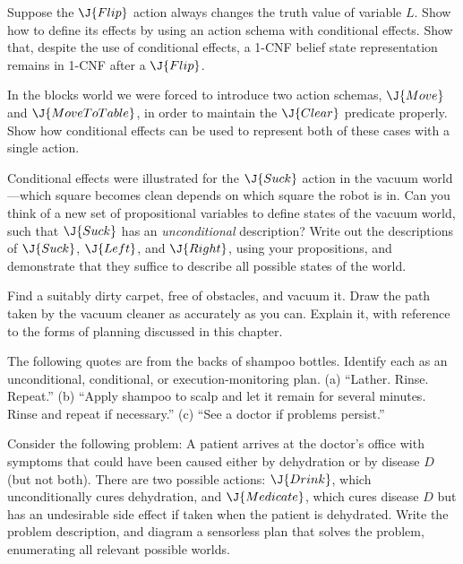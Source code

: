\begin{exercise}
Suppose the \(\J{Flip}\) action always changes the truth value of variable \(L\).
Show how to define its effects by using an action schema with conditional effects.
Show that, despite the use of conditional effects, a 1-CNF belief state representation remains in 1-CNF after a \(\J{Flip}\).
\end{exercise} 

\begin{exercise}
In the blocks 
world we were forced to introduce two
action schemas, \(\J{Move}\) and \(\J{MoveToTable}\), in order to
maintain the \(\J{Clear}\) predicate properly. Show how conditional effects can
be used to represent both of these cases with a single action.
\end{exercise} 

\begin{exercise}
Conditional effects were illustrated for the \(\J{Suck}\) action in the
vacuum world---which square becomes clean depends on which square the
robot is in. Can you think of a new set of propositional variables to
define states of the vacuum world, such that \(\J{Suck}\) has an
{\em unconditional} description? Write out the descriptions of \(\J{Suck}\),
\(\J{Left}\), and \(\J{Right}\), using your propositions, and demonstrate that they
suffice to describe all possible states of the world.
\end{exercise} 

\begin{uexercise}
Find a suitably dirty carpet, free of obstacles, and vacuum it.
Draw the path taken by the vacuum cleaner as accurately as you can.
Explain it, with reference to the forms of planning discussed in this
chapter.
\end{uexercise} 

\begin{iexercise}
The following quotes are from the backs of shampoo bottles.  Identify each as 
an unconditional, conditional, or execution-monitoring plan.  (a) ``Lather.  
Rinse.  Repeat.''  (b) ``Apply shampoo to scalp and let it remain for several 
minutes.  Rinse and repeat if necessary.''  (c) ``See a doctor if problems 
persist.''
\end{iexercise} 

\begin{iexercise}
Consider the following problem: A patient arrives at the doctor's
office with symptoms that could have been caused either by dehydration
or by disease \(D\) (but not both).  There are two possible actions:
\(\J{Drink}\), which unconditionally cures dehydration, and
\(\J{Medicate}\), which cures disease \(D\) but has an undesirable side effect
if taken when the patient is dehydrated.  Write the problem
description, and diagram a sensorless plan that solves the
problem, enumerating all relevant possible worlds.
\end{iexercise} 

